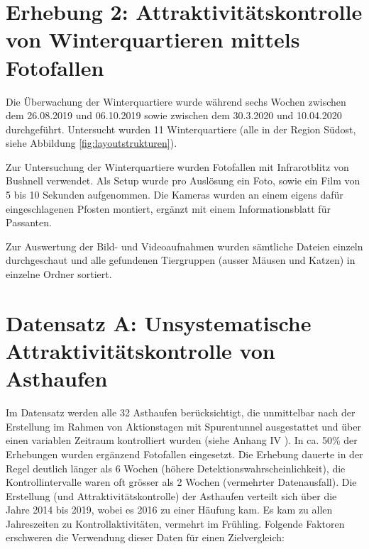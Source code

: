 \documentclass[
  oneside]{scrbook}
\begin{document}
\hypertarget{erhebung-2-attraktivituxe4tskontrolle-von-winterquartieren-mittels-fotofallen}{%
\section{Erhebung 2: Attraktivitätskontrolle von Winterquartieren mittels Fotofallen}\label{erhebung-2-attraktivituxe4tskontrolle-von-winterquartieren-mittels-fotofallen}}

Die Überwachung der Winterquartiere wurde während sechs Wochen zwischen dem 26.08.2019 und 06.10.2019 sowie zwischen dem 30.3.2020 und 10.04.2020 durchgeführt. Untersucht wurden 11 Winterquartiere (alle in der Region Südost, siehe Abbildung \ref{fig:layoutstrukturen}).

Zur Untersuchung der Winterquartiere wurden Fotofallen mit Infrarotblitz von Bushnell verwendet. Als Setup wurde pro Auslösung ein Foto, sowie ein Film von 5 bis 10 Sekunden aufgenommen. Die Kameras wurden an einem eigens dafür eingeschlagenen Pfosten montiert, ergänzt mit einem Informationsblatt für Passanten.

Zur Auswertung der Bild- und Videoaufnahmen wurden sämtliche Dateien einzeln durchgeschaut und alle gefundenen Tiergruppen (ausser Mäusen und Katzen) in einzelne Ordner sortiert.

\hypertarget{datensatz-a-unsystematische-attraktivituxe4tskontrolle-von-asthaufen}{%
\section{Datensatz A: Unsystematische Attraktivitätskontrolle von Asthaufen}\label{datensatz-a-unsystematische-attraktivituxe4tskontrolle-von-asthaufen}}

Im Datensatz werden alle 32 Asthaufen berücksichtigt, die unmittelbar nach der Erstellung im Rahmen von Aktionstagen mit Spurentunnel ausgestattet und über einen variablen Zeitraum kontrolliert wurden (siehe Anhang IV ). In ca. 50\% der Erhebungen wurden ergänzend Fotofallen eingesetzt. Die Erhebung dauerte in der Regel deutlich länger als 6 Wochen (höhere Detektionswahrscheinlichkeit), die Kontrollintervalle waren oft grösser als 2 Wochen (vermehrter Datenausfall). Die Erstellung (und Attraktivitätskontrolle) der Asthaufen verteilt sich über die Jahre 2014 bis 2019, wobei es 2016 zu einer Häufung kam. Es kam zu allen Jahreszeiten zu Kontrollaktivitäten, vermehrt im Frühling. Folgende Faktoren erschweren die Verwendung dieser Daten für einen Zielvergleich:
\end{document}
